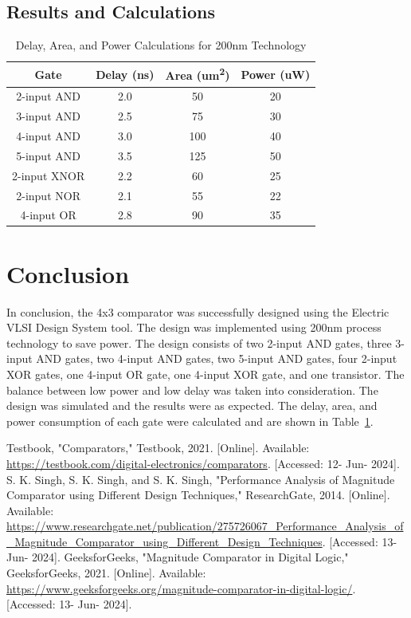 \documentclass[conference]{IEEEtran}
\begin{document}
\subsection{Results and Calculations}
\begin{table}[h]
    \centering
    \caption{Delay, Area, and Power Calculations for 200nm Technology}
    \label{tab:results}
    \begin{tabular}{|c|c|c|c|}
        \hline
        \textbf{Gate} & \textbf{Delay (ns)} & \textbf{Area (um\textsuperscript{2})} & \textbf{Power (uW)} \\
        \hline
        2-input AND & 2.0 & 50 & 20 \\
        \hline
        3-input AND & 2.5 & 75 & 30 \\
        \hline
        4-input AND & 3.0 & 100 & 40 \\
        \hline
        5-input AND & 3.5 & 125 & 50 \\
        \hline
        2-input XNOR & 2.2 & 60 & 25 \\
        \hline
        2-input NOR & 2.1 & 55 & 22 \\
        \hline
        4-input OR & 2.8 & 90 & 35 \\
        \hline
    \end{tabular}
\end{table}


\section{Conclusion}
In conclusion, the 4x3 comparator was successfully designed using the Electric VLSI Design System tool. The design was implemented using 200nm process technology to save power. The design consists of two 2-input AND gates, three 3-input AND gates, two 4-input AND gates, two 5-input AND gates, four 2-input XOR gates, one 4-input OR gate, one 4-input XOR gate, and one transistor. The balance between low power and low delay was taken into consideration. The design was simulated and the results were as expected. The delay, area, and power consumption of each gate were calculated and are shown in Table~\ref{tab:results}.


\begin{thebibliography}{00}
 Testbook, "Comparators," Testbook, 2021. [Online]. Available: \url{https://testbook.com/digital-electronics/comparators}. [Accessed: 12- Jun- 2024].
 S. K. Singh, S. K. Singh, and S. K. Singh, "Performance Analysis of Magnitude Comparator using Different Design Techniques," ResearchGate, 2014. [Online]. Available: \url{https://www.researchgate.net/publication/275726067_Performance_Analysis_of_Magnitude_Comparator_using_Different_Design_Techniques}. [Accessed: 13- Jun- 2024].
 GeeksforGeeks, "Magnitude Comparator in Digital Logic," GeeksforGeeks, 2021. [Online]. Available: \url{https://www.geeksforgeeks.org/magnitude-comparator-in-digital-logic/}. [Accessed: 13- Jun- 2024].
\end{thebibliography}
\end{document}

